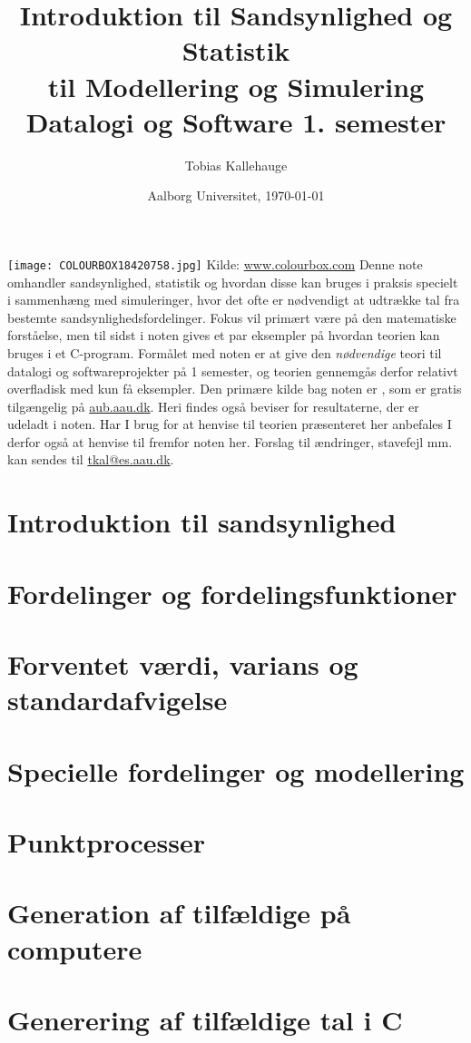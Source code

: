 \documentclass{article}
\title{Introduktion til Sandsynlighed og Statistik \\
til Modellering og Simulering  \\
\large Datalogi og Software 1. semester}
\date{Aalborg Universitet, \today}
\author{Tobias Kallehauge}
\begin{document}
\maketitle
\texttt{[image: COLOURBOX18420758.jpg]}
\small Kilde: \href{www.colourbox.com}{www.colourbox.com}
\newpage
Denne note omhandler sandsynlighed, statistik og hvordan disse kan bruges i praksis specielt i sammenhæng med simuleringer, hvor det ofte er nødvendigt at udtrække tal fra bestemte sandsynlighedsfordelinger. Fokus vil primært være på den matematiske forståelse, men til sidst i noten gives et par eksempler på hvordan teorien kan bruges i et C-program. Formålet med noten er at give den \emph{nødvendige} teori til datalogi  og softwareprojekter på  1 semester, og teorien gennemgås derfor relativt overfladisk med kun få eksempler. Den primære kilde bag noten er \cite{olofsson2012}, som er gratis tilgængelig på \href{aub.aau.dk}{aub.aau.dk}. Heri findes også beviser for resultaterne, der er udeladt i noten. Har I brug for at henvise til teorien præsenteret her anbefales I derfor også at henvise til \cite{olofsson2012} fremfor noten her. Forslag til ændringer, stavefejl mm. kan sendes til \href{mailto:tkal@es.aau.dk}{tkal@es.aau.dk}. 
\section{Introduktion til sandsynlighed}


\section{Fordelinger og fordelingsfunktioner}


\section{Forventet værdi, varians og standardafvigelse}


\section{Specielle fordelinger og modellering}


\section{Punktprocesser} \label{sec:pointprocess}


\section{Generation af tilfældige på computere}


\section{Generering af tilfældige tal i C}



\printbibliography[heading=bibintoc]
\label{bib:mybiblio}
\end{document}
